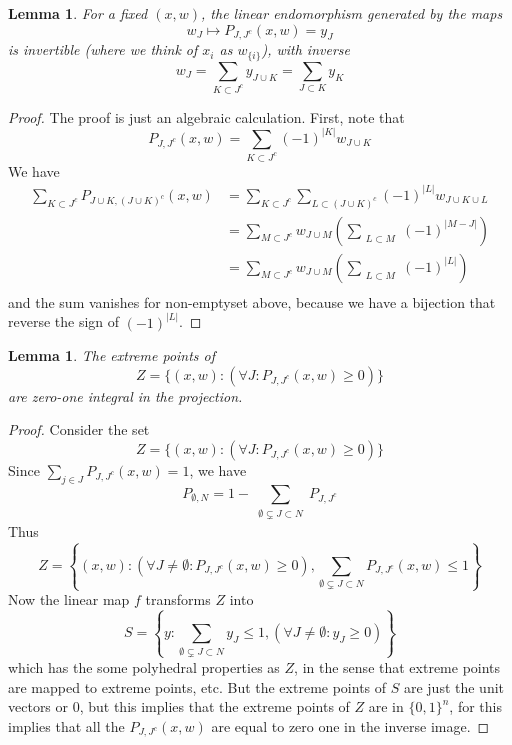 \documentclass{article}
\theoremstyle{plain}
\newtheorem{lemma}[theorem]{Lemma}
\theoremstyle{definition}
\begin{document}
\begin{lemma}
    For a fixed $(x,w)$, the linear endomorphism generated by the maps
    \[ w_J \mapsto P_{J,J^c}(x,w) = y_J \]
    is invertible (where we think of $x_i$ as $w_{\{i\}}$), with inverse
    \[ w_J = \sum_{K \subset J^c} y_{J \cup K} = \sum_{J \subset K} y_K \]
\end{lemma}
\begin{proof}
    The proof is just an algebraic calculation. First, note that
    \[ P_{J,J^c}(x,w) = \sum_{K \subset J^c} (-1)^{|K|} w_{J \cup K} \]
    We have
    \begin{align*}
        \sum_{K \subset J^c} P_{J \cup K, (J \cup K)^c}(x,w) &= \sum_{K \subset J^c} \sum_{L \subset (J \cup K)^c} (-1)^{|L|} w_{J \cup K \cup L}\\
        &= \sum_{M \subset J^c} w_{J \cup M} \left( \sum_{\substack{L \subset M}} (-1)^{|M-J|} \right)\\
        &= \sum_{M \subset J^c} w_{J \cup M} \left( \sum_{\substack{L \subset M}} (-1)^{|L|} \right)\\
    \end{align*}
    and the sum vanishes for non-emptyset above, because we have a bijection that reverse the sign of $(-1)^{|L|}$.
\end{proof}

\begin{lemma}
    The extreme points of
    \[ Z = \{ (x,w) : (\forall J: P_{J,J^c}(x,w) \geq 0) \} \]
    are zero-one integral in the projection.
\end{lemma}
\begin{proof}
    Consider the set
    \[ Z = \{ (x,w) : (\forall J: P_{J,J^c}(x,w) \geq 0) \} \]
    Since $\sum_{j \in J} P_{J,J^c}(x,w) = 1$, we have
    \[ P_{\emptyset,N} = 1 - \sum_{\substack{\emptyset \subsetneq J \subset N}} P_{J,J^c} \]
    Thus
    \[ Z = \left\{ (x,w) : (\forall J \neq \emptyset: P_{J,J^c}(x,w) \geq 0), \sum_{\emptyset \subsetneq J \subset N} P_{J,J^c}(x,w) \leq 1 \right\} \]
    Now the linear map $f$ transforms $Z$ into 
    \[ S = \left\{ y : \sum_{\emptyset \subsetneq J \subset N} y_J \leq 1, (\forall J \neq \emptyset: y_J \geq 0) \right\} \]
    which has the some polyhedral properties as $Z$, in the sense that extreme points are mapped to extreme points, etc. But the extreme points of $S$ are just the unit vectors or 0, but this implies that the extreme points of $Z$ are in $\{ 0, 1 \}^n$, for this implies that all the $P_{J,J^c}(x,w)$ are equal to zero one in the inverse image.
\end{proof}
\end{document}
